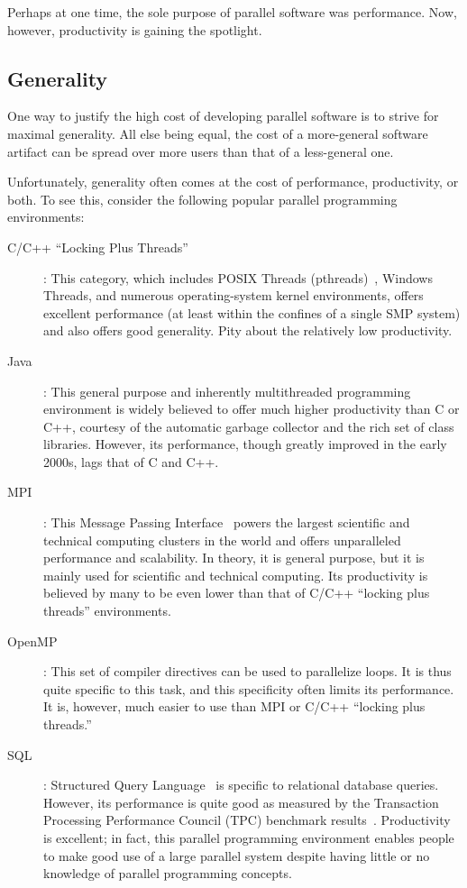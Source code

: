 Perhaps at one time, the sole purpose of parallel software was performance.
Now, however, productivity is gaining the spotlight.

\subsection{Generality}
\label{sec:intro:Generality}

One way to justify the high cost of developing parallel software
is to strive for maximal generality.
All else being equal, the cost of a more-general software artifact
can be spread over more users than that of a less-general one.

Unfortunately, generality often comes at the cost of performance,
productivity, or both.
To see this, consider the following popular parallel programming
environments:

\begin{description}
\item[C/C++ ``Locking Plus Threads'']: This category, which includes
	POSIX Threads (pthreads)~\cite{OpenGroup1997pthreads},
	Windows Threads, and numerous
	operating-system kernel environments, offers excellent performance
	(at least within the confines of a single SMP system)
	and also offers good generality.
	Pity about the relatively low productivity.
\item[Java]: This general purpose and inherently multithreaded
	programming environment	is widely believed to offer much higher
	productivity than C or C++, courtesy of the automatic garbage collector
	and the rich set of class libraries.
	However, its performance, though greatly improved in the early
	2000s, lags that of C and C++.
\item[MPI]: This Message Passing Interface~\cite{MPIForum2008} powers
	the largest scientific and technical computing clusters in
	the world and offers unparalleled performance and scalability.
	In theory, it is general purpose, but it is mainly used
	for scientific and technical computing.
	Its productivity is believed by many to be even lower than that
	of C/C++ ``locking plus threads'' environments.
\item[OpenMP]: This set of compiler directives can be used
	to parallelize loops.  It is thus quite specific to this
	task, and this specificity often limits its performance.
	It is, however, much easier to use than MPI or C/C++
	``locking plus threads.''
\item[SQL]: Structured Query Language~\cite{DIS9075SQL92} is
	specific to relational database queries.
	However, its performance is quite good as measured by the
	Transaction Processing Performance Council (TPC)
	benchmark results~\cite{TPC}.
	Productivity is excellent; in fact, this parallel programming
	environment enables people to make good use of a large parallel
	system despite having little or no knowledge of parallel
	programming concepts.
\end{description}

